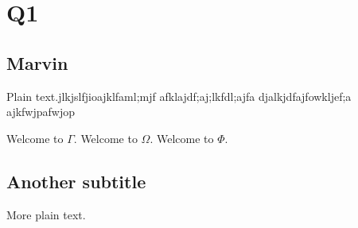 \documentclass{article}
\begin{document}
\section{Q1}

\subsection{Marvin}

Plain text.jlkjslfjioajklfaml;mjf
afklajdf;aj;lkfdl;ajfa
djalkjdfajfowkljef;a
ajkfwjpafwjop

Welcome to $\Gamma$. 
Welcome to $\Omega$.
Welcome to $\Phi$.
\subsection{Another subtitle}

More plain text.
\end{document}
